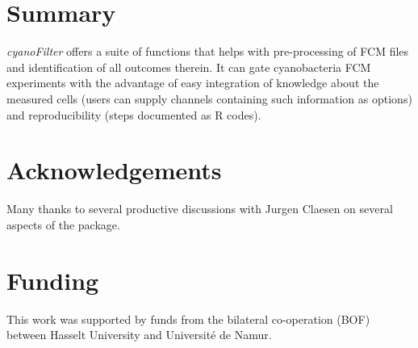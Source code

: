 \documentclass[a4paper,12pt]{extarticle}
\begin{document}



%
%
\vspace*{-0.1in}
\section{Summary}
 \emph{cyanoFilter} offers a suite of functions that helps with pre-processing of FCM files and identification of all outcomes therein. It can gate cyanobacteria FCM experiments with the advantage of easy integration of knowledge about the measured cells (users can supply channels containing such information as options) and reproducibility (steps documented as R codes).
 \vspace*{-18pt}
\section*{Acknowledgements}
Many thanks to several productive discussions with Jurgen Claesen on several aspects of the package.
\vspace*{-12pt}
\section*{Funding}
This work was supported by funds from the bilateral co-operation (BOF) between Hasselt University and Universit\'{e} de Namur.\vspace*{-12pt}
\end{document}

